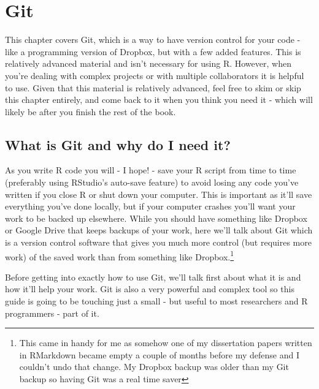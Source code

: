 \documentclass[
]{krantz}
\begin{document}
\hypertarget{git}{%
\chapter{Git}\label{git}}

This chapter covers Git, which is a way to have version control for your code - like a programming version of Dropbox, but with a few added features. This is relatively advanced material and isn't necessary for using R. However, when you're dealing with complex projects or with multiple collaborators it is helpful to use. Given that this material is relatively advanced, feel free to skim or skip this chapter entirely, and come back to it when you think you need it - which will likely be after you finish the rest of the book.

\hypertarget{what-is-git-and-why-do-i-need-it}{%
\section{What is Git and why do I need it?}\label{what-is-git-and-why-do-i-need-it}}

As you write R code you will - I hope! - save your R script from time to time (preferably using RStudio's auto-save feature) to avoid losing any code you've written if you close R or shut down your computer. This is important as it'll save everything you've done locally, but if your computer crashes you'll want your work to be backed up elsewhere. While you should have something like Dropbox or Google Drive that keeps backups of your work, here we'll talk about Git which is a version control software that gives you much more control (but requires more work) of the saved work than from something like Dropbox.\footnote{This came in handy for me as somehow one of my dissertation papers written in RMarkdown became empty a couple of months before my defense and I couldn't undo that change. My Dropbox backup was older than my Git backup so having Git was a real time saver}

Before getting into exactly how to use Git, we'll talk first about what it is and how it'll help your work. Git is also a very powerful and complex tool so this guide is going to be touching just a small - but useful to most researchers and R programmers - part of it.
\end{document}
